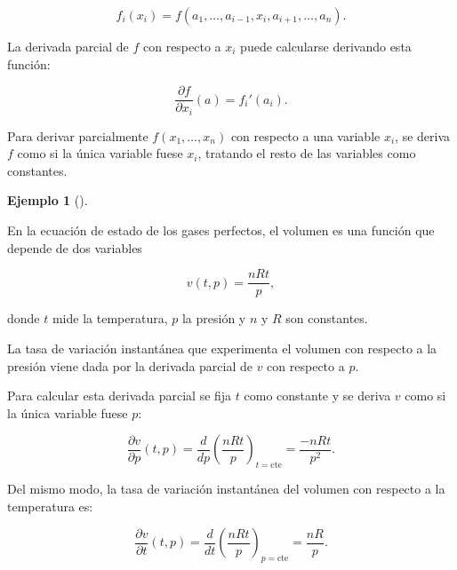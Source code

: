 \documentclass[
  a4paper,
]{scrreport}
\theoremstyle{definition}
\theoremstyle{plain}
\theoremstyle{plain}
\theoremstyle{definition}
\theoremstyle{definition}
\newtheorem{example}{Ejemplo}[chapter]
\theoremstyle{plain}
\theoremstyle{remark}
\begin{document}
\[
f_i(x_i)=f(a_1,\ldots,a_{i-1},x_i,a_{i+1},\ldots,a_n).
\]

La derivada parcial de \(f\) con respecto a \(x_i\) puede calcularse
derivando esta función:

\[
\frac{\partial f}{\partial x_i}(a)=f_i'(a_i).
\]

\begin{tcolorbox}[enhanced jigsaw, breakable, title=\textcolor{quarto-callout-important-color}{\faExclamation}\hspace{0.5em}{Regla}, toprule=.15mm, coltitle=black, arc=.35mm, rightrule=.15mm, colframe=quarto-callout-important-color-frame, colbacktitle=quarto-callout-important-color!10!white, toptitle=1mm, titlerule=0mm, leftrule=.75mm, opacityback=0, colback=white, bottomrule=.15mm, bottomtitle=1mm, left=2mm, opacitybacktitle=0.6]

Para derivar parcialmente \(f(x_1,\ldots,x_n)\) con respecto a una
variable \(x_i\), se deriva \(f\) como si la única variable fuese
\(x_i\), tratando el resto de las variables como constantes.

\end{tcolorbox}

\begin{example}[]\protect\hypertarget{exm-calculo-derivada-parcial}{}\label{exm-calculo-derivada-parcial}

En la ecuación de estado de los gases perfectos, el volumen es una
función que depende de dos variables

\[
v(t,p)=\frac{nRt}{p},
\]

donde \(t\) mide la temperatura, \(p\) la presión y \(n\) y \(R\) son
constantes.

La tasa de variación instantánea que experimenta el volumen con respecto
a la presión viene dada por la derivada parcial de \(v\) con respecto a
\(p\).

Para calcular esta derivada parcial se fija \(t\) como constante y se
deriva \(v\) como si la única variable fuese \(p\):

\[
\frac{\partial v}{\partial p}(t,p)=\frac{d}{dp}\left(\frac{nRt}{p}\right)_{\mbox{$t=$cte}}=\frac{-nRt}{p^2}.
\]

Del mismo modo, la tasa de variación instantánea del volumen con
respecto a la temperatura es:

\[
\frac{\partial v}{\partial t}(t,p)=\frac{d}{dt}\left(\frac{nRt}{p}\right)_{\mbox{$p=$cte}}=\frac{nR}{p}.
\]

\end{example}
\end{document}
